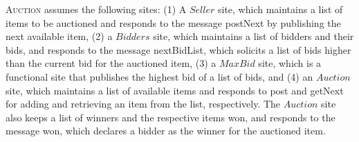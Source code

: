 \documentclass{eptcs}
\begin{document}
\textsc{Auction} assumes the following sites: (1) A $\mathit{Seller}$ site, which maintains a list of items to be auctioned and responds to the message \textsf{postNext} by publishing the next available item, (2) a $\mathit{Bidders}$ site, which maintains a list of bidders and their bids, and responds to the message \textsf{nextBidList},  which solicits a list of bids higher than the current bid for the auctioned item, (3) a $\mathit{MaxBid}$ site, which is a functional site that publishes the highest bid of a list of bids, and (4) an $\mathit{Auction}$ site, which maintains a list of available items and responds to \textsf{post} and \textsf{getNext} for adding and retrieving an item from the list, respectively. The $\mathit{Auction}$ site also keeps a list of winners and the respective items won, and responds to the message \textsf{won}, which declares a bidder as the winner for the auctioned item.
\end{document}
